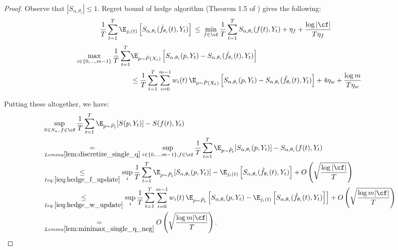   
  \begin{proof}
  Observe that $|S_{\alpha, \theta_i}| \leq 1$. Regret bound of hedge algorithm (Theorem 1.5 of \cite{hazanoco}) gives the following:
  \begin{align}
    \frac{1}{T} \sum_{t=1}^T \E_{j_i(t)}\left[S_{\alpha, \theta_i}(\hat{f}_{\theta_i}(t), Y_t) \right]
    & \,\leq\, \min_{f \in \cf} \frac{1}{T} \sum_{t=1}^T S_{\alpha, \theta_i}(f(t), Y_t) + \eta_f + \frac{\log|\cf|}{T\eta_f} \label{ieq:hedge_f_update}
  \end{align}
  \begin{align}
    \max_{i \in \{0, \ldots, m-1\}} \frac{1}{T} \sum_{t=1}^T 
    & \E_{p\sim \hat{P}(X_t)}\left[ S_{\alpha, \theta_i}(p, Y_t) - S_{\alpha, \theta_i}(\hat{f}_{\theta_i}(t), Y_t) \right] \nonumber\\
    & \leq \frac{1}{T} \sum_{t=1}^T \sum_{i=0}^{m-1} w_i(t) \, \E_{p\sim \hat{P}(X_t)}\left[ S_{\alpha, \theta_i}(p, Y_t) - S_{\alpha, \theta_i}(\hat{f}_{\theta_i}(t), Y_t) \right] + 4\eta_w + \frac{\log m}{T\eta_w} \label{ieq:hedge_w_update}
  \end{align}
  
  Putting these altogether, we have:
    \begin{align*}
      & \sup_{S \in S_\alpha,\, f \in \cf} \frac{1}{T} \sum_{t=1}^T \E_{p \sim \hat{P}_t} [S(p, Y_t)] - S(f(t), Y_t) \\
      & \underset{Lemma \ref{lem:discretize_single_q}}{=} \sup_{i \in \{0, \ldots, m-1\}, f \in \cf} \frac{1}{T} \sum_{t=1}^T \E_{p \sim \hat{P}_t} [S_{\alpha, \theta_i}(p, Y_t)] - S_{\alpha, \theta_i}(f(t), Y_t) \\
      & \underset{Ieq. \eqref{ieq:hedge_f_update}}{\leq} \sup_i \frac{1}{T} \sum_{t=1}^T \E_{p \sim \hat{P}_t} [S_{\alpha, \theta_i}(p, Y_t)] - \E_{j_i(t)}\left[S_{\alpha, \theta_i}(\hat{f}_{\theta_i}(t), Y_t) \right] + O\left(\sqrt{\frac{\log|\cf|}{T}}\right) \\
      & \underset{Ieq. \eqref{ieq:hedge_w_update}}{\leq} \sup_i \frac{1}{T} \sum_{t=1}^T \sum_{i=0}^{m-1} w_i(t) \, \E_{p\sim \hat{P}_t}\left[ S_{\alpha, \theta_i}(p, Y_t) - \E_{j_i(t)}\left[S_{\alpha, \theta_i}(\hat{f}_{\theta_i}(t), Y_t) \right] \right] + O\left(\sqrt{\frac{\log m|\cf|}{T}}\right) \\
      & \underset{Lemma \ref{lem:minimax_single_q_neg}}{=} O\left(\sqrt{\frac{\log m|\cf|}{T}}\right).
    \end{align*}
  \end{proof}





